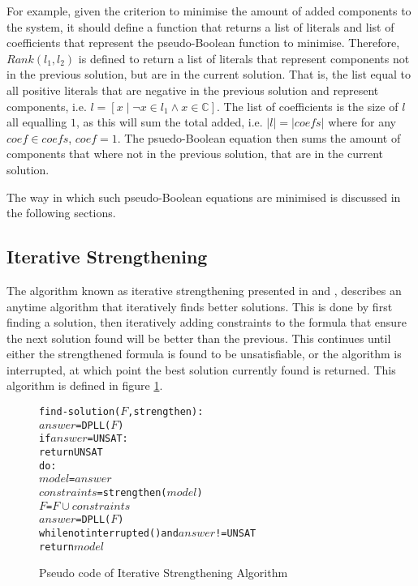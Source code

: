 For example, given the criterion to minimise the amount of added components to the system, 
it should define a function that returns a list of literals and list of coefficients that represent the pseudo-Boolean function to minimise.
Therefore, $Rank(l_1,l_2)$ is defined to return a list of literals that represent components not in the previous solution, but are in the current solution.
That is, the list equal to all positive literals that are negative in the previous solution and represent components, i.e. $l = [x \mid \neg x \in l_1 \wedge x \in \mathbb{C}]$.
The list of coefficients is the size of $l$ all equalling $1$, as this will sum the total added, i.e. $|l| = |coefs|$ where for any $coef \in coefs$, $coef = 1$. 
The psuedo-Boolean equation then sums the amount of components that where not in the previous solution, that are in the current solution.

The way in which such pseudo-Boolean equations are minimised is discussed in the following sections. 

\subsection{Iterative Strengthening}
The algorithm known as iterative strengthening presented in \cite{calistri1994iterative} and \cite{le2010sat4j}, 
describes an anytime algorithm that iteratively finds better solutions.
This is done by first finding a solution, then iteratively adding constraints to the formula that ensure the next solution found will be better than the previous.
This continues until either the strengthened formula is found to be unsatisfiable, or the algorithm is interrupted, at which point the best solution currently found is returned. 
This algorithm is defined in figure \ref{impl.strength}.

\begin{figure}[htp]
\begin{center}
\begin{alltt}
find-solution(\(F\),strengthen):
    \(answer\) = DPLL(\(F\))
    if \(answer\) = UNSAT:
        return UNSAT
    do:
        \(model\) = \(answer\)
        \(constraints\) = strengthen(\(model\))
        \(F\) = \(F \cup constraints\)
        \(answer\) = DPLL(\(F\))
    while not interrupted() and \(answer\) != UNSAT
    return \(model\) 
\end{alltt}
  \caption{Pseudo code of Iterative Strengthening Algorithm}
  \label{impl.strength}
\end{center}
\end{figure}

